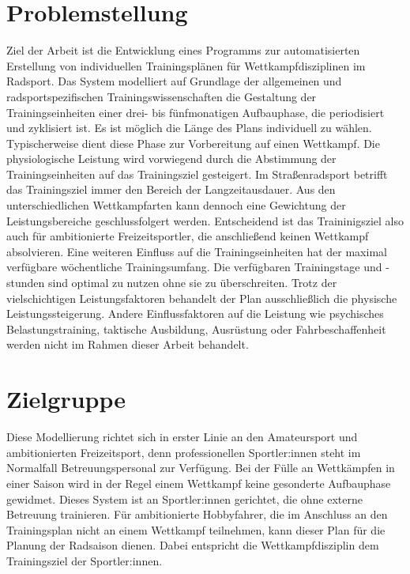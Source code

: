 \section{Problemstellung}
\label{sec:einleitung:problem}
Ziel der Arbeit ist die Entwicklung eines Programms zur automatisierten Erstellung von individuellen Trainingsplänen für Wettkampfdisziplinen im Radsport.
Das System modelliert auf Grundlage der allgemeinen und radsportspezifischen Trainingswissenschaften die Gestaltung der Trainingseinheiten einer drei- bis fünfmonatigen Aufbauphase, die periodisiert und zyklisiert ist. Es ist möglich die Länge des Plans individuell zu wählen. 
Typischerweise dient diese Phase zur Vorbereitung auf einen Wettkampf. Die physiologische Leistung wird vorwiegend durch die Abstimmung der Trainingseinheiten auf das Trainingsziel gesteigert. Im Straßenradsport betrifft das Trainingsziel immer den Bereich der Langzeitausdauer. Aus den unterschiedlichen Wettkampfarten kann dennoch eine Gewichtung der Leistungsbereiche geschlussfolgert werden. Entscheidend ist das Traininigsziel also auch für ambitionierte Freizeitsportler, die anschließend keinen Wettkampf absolvieren.\newline
Eine weiteren Einfluss auf die Trainingseinheiten hat der maximal verfügbare wöchentliche Trainingsumfang. Die verfügbaren Trainingstage und -stunden sind optimal zu nutzen ohne sie zu überschreiten. 
Trotz der vielschichtigen Leistungsfaktoren behandelt der Plan ausschließlich die physische Leistungssteigerung. Andere Einflussfaktoren auf die Leistung wie psychisches Belastungstraining, taktische Ausbildung, Ausrüstung oder Fahrbeschaffenheit \cite[13-15]{Radsporttraining} werden nicht im Rahmen dieser Arbeit behandelt.

\section{Zielgruppe}
Diese Modellierung richtet sich in erster Linie an den Amateursport und ambitionierten Freizeitsport, denn professionellen Sportler:innen steht im Normalfall Betreuungspersonal zur Verfügung. Bei der Fülle an Wettkämpfen in einer Saison wird in der Regel einem Wettkampf keine gesonderte Aufbauphase gewidmet. Dieses System ist an Sportler:innen gerichtet, die ohne externe Betreuung trainieren. Für ambitionierte Hobbyfahrer, die im Anschluss an den Trainingsplan nicht an einem Wettkampf teilnehmen, kann dieser Plan für die Planung der Radsaison dienen. Dabei entspricht die Wettkampfdisziplin dem Trainingsziel der Sportler:innen.

